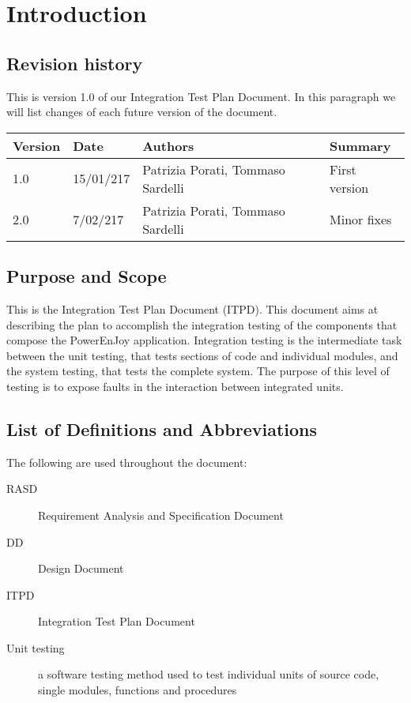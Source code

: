 \section{Introduction}

\subsection{Revision history}
This is version 1.0 of our Integration Test Plan Document.
In this paragraph we will list changes of each future version of the document. \\

\begin{tabular}{|l|l|l|l|}
	\hline
	\textbf{Version}	& \textbf{Date}	& \textbf{Authors}	& \textbf{Summary}\\
	\hline
	1.0					& 15/01/217		& Patrizia Porati, Tommaso Sardelli	& First version\\
	\hline
	2.0					& 7/02/217		& Patrizia Porati, Tommaso Sardelli	& Minor fixes\\
\hline
\end{tabular}

\subsection{Purpose and Scope}
This is the Integration Test Plan Document (ITPD). This document aims at describing the plan to accomplish the integration testing of the components that compose the PowerEnJoy application.
Integration testing is the intermediate task between the unit testing, that tests sections of code and individual modules, and the system testing, that tests the complete system.
The purpose of this level of testing is to expose faults in the interaction between integrated units.

\subsection{List of Definitions and Abbreviations}
The following are used throughout the document:
\begin{description}
	\item [RASD] Requirement Analysis and Specification Document
	\item [DD] Design Document
	\item [ITPD] Integration Test Plan Document
	\item [Unit testing] a software testing method used to test individual units of source code, single modules, functions and procedures
\end{description}

